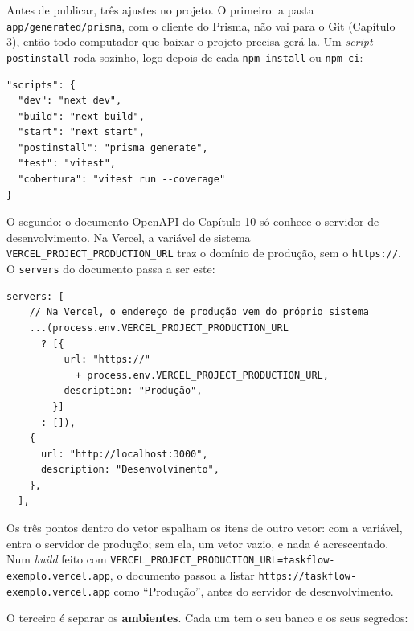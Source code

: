 Antes de publicar, três ajustes no projeto. O primeiro: a pasta \texttt{app/generated/prisma}, com o cliente do Prisma, não vai para o Git (Capítulo 3), então todo computador que baixar o projeto precisa gerá-la. Um \textit{script} \texttt{postinstall} roda sozinho, logo depois de cada \texttt{npm install} ou \texttt{npm ci}:

\begin{codigo}
\begin{Verbatim}[breaklines=true, breaksymbolleft={}, fontsize=\footnotesize]
"scripts": {
  "dev": "next dev",
  "build": "next build",
  "start": "next start",
  "postinstall": "prisma generate",
  "test": "vitest",
  "cobertura": "vitest run --coverage"
}
\end{Verbatim}
\end{codigo}

O segundo: o documento OpenAPI do Capítulo 10 só conhece o servidor de desenvolvimento. Na Vercel, a variável de sistema \texttt{VERCEL\_PROJECT\_PRODUCTION\_URL} traz o domínio de produção, sem o \texttt{https://}. O \texttt{servers} do documento passa a ser este:

\begin{codigo}
\begin{Verbatim}[breaklines=true, breaksymbolleft={}, fontsize=\footnotesize]
  servers: [
    // Na Vercel, o endereço de produção vem do próprio sistema
    ...(process.env.VERCEL_PROJECT_PRODUCTION_URL
      ? [{
          url: "https://"
            + process.env.VERCEL_PROJECT_PRODUCTION_URL,
          description: "Produção",
        }]
      : []),
    {
      url: "http://localhost:3000",
      description: "Desenvolvimento",
    },
  ],
\end{Verbatim}
\end{codigo}

Os três pontos dentro do vetor espalham os itens de outro vetor: com a variável, entra o servidor de produção; sem ela, um vetor vazio, e nada é acrescentado. Num \textit{build} feito com \texttt{VERCEL\_PROJECT\_PRODUCTION\_URL=taskflow-exemplo.vercel.app}, o documento passou a listar \texttt{https://taskflow-exemplo.vercel.app} como ``Produção'', antes do servidor de desenvolvimento.

O terceiro é separar os \textbf{ambientes}. Cada um tem o seu banco e os seus segredos:

